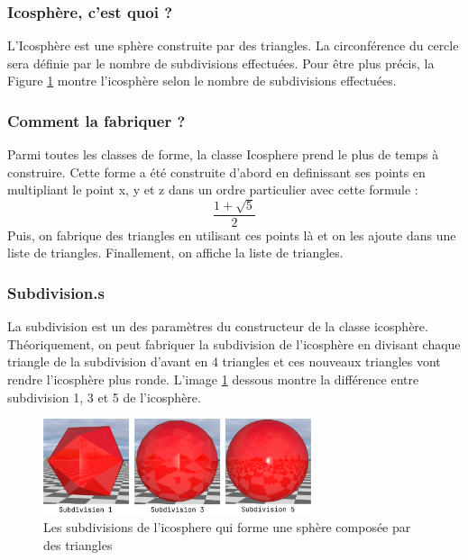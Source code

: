 \documentclass[12pt]{article}
\begin{document}
\subsubsection{Icosphère, c'est quoi ?}
L'Icosphère est une sphère construite par des triangles. La circonférence du cercle sera définie par le nombre de subdivisions effectuées. Pour être plus précis, la Figure \ref{fig:image_subdiv} montre l'icosphère selon le nombre de subdivisions effectuées.

\subsubsection{Comment la fabriquer ?}
Parmi toutes les classes de forme, la classe Icosphere prend le plus de temps à construire. 
Cette forme a été construite d'abord en definissant ses points en multipliant le point x, y et z dans un ordre particulier avec cette formule :
$$\frac{1+\sqrt{5}}{2}$$
Puis, on fabrique des triangles en utilisant ces points là et on les ajoute dans une liste de triangles.
Finallement, on affiche la liste de triangles.

\subsubsection{Subdivision.s}
La subdivision est un des paramètres du constructeur de la classe icosphère.
Théoriquement, on peut fabriquer la subdivision de l'icosphère en divisant chaque triangle de la subdivision d'avant en 4 triangles et ces nouveaux triangles vont rendre l'icosphère plus ronde.
L'image \ref{fig:image_subdiv} dessous montre la différence entre subdivision 1, 3 et 5 de l'icosphère.

\begin{figure}[ht]
  \begin{center}
    \includegraphics[width=0.7\textwidth]{./img/formes/subdivicosp.png} 
  \caption{Les subdivisions de l'icosphere qui forme une sphère composée par des triangles}
  \label{fig:image_subdiv}
\end{center}
\end{figure}
\FloatBarrier
\end{document}
